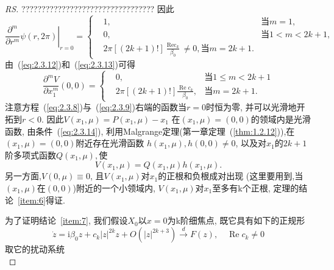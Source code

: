 \begin{proof}[RS]
?????????????????????????????????
因此
\begin{equation}
\label{eq:2.3.13}
\left.\frac{\partial^{m}}{\partial r^{m}} \psi(r, 2 \pi)\right|_{r=0}
=
\left\{
\begin{aligned}
  &1, &\text{当} m=1,\\
  &0, &\text{当} 1<m<2k+1,\\
  &2 \pi[(2 k+1) !] \frac{\operatorname{Rec}_{k}}{\beta_{0}} \neq 0,
  \text{当} m=2k+1.
\end{aligned}
  \right.
\end{equation}
由~(\ref{eq:2.3.12})和~(\ref{eq:2.3.13})可得
\begin{equation}
\label{eq:2.3.14}
\frac{\partial^{m} V}{\partial x_{1}^{m}}(0,0)
=
\left\{
\begin{aligned}
  &0,&\text{当} 1 \leqslant m<2 k+1\\
  &2 \pi[(2 k+1) !] \frac{\operatorname{Re} c_{k}}{\beta_{0}},
  &当m=2k+1.
\end{aligned}
  \right.
\end{equation}
注意方程~(\ref{eq:2.3.8})与~(\ref{eq:2.3.9})右端的函数当$r=0$时恒为零,
并可以光滑地开拓到$r<0$.
因此$V\left(x_{1}, \mu\right)=P\left(x_{1}, \mu\right)-x_{1}$
在$(x_1,\mu)=(0,0)$的领域内是光滑函数,
由条件~(\ref{eq:2.3.14}),
利用Malgrange定理(第一章定理~(\ref{thm:1.2.12})),在$(x_1,\mu)=(0,0)$附近存在光滑函数
$h\left(x_{1}, \mu\right), h(0,0) \neq 0$,
以及对$x_1$的$2k+1$阶多项式函数$Q(x_1,\mu),$使
$$
V\left(x_{1}, \mu\right)=Q\left(x_{1}, \mu\right) h\left(x_{1}, \mu\right).
$$
另一方面,$V(0, \mu) \equiv 0$,
且$V(x_1,\mu)$对$x_1$的正根和负根成对出现
(这里要用到,当$(x_1,\mu)$在$(0,0)$)附近的一个小领域内,
$V(x_1,\mu)$对$x_1$至多有k个正根,
定理的结论~\ref{item:6}得证.
\par
为了证明结论~\ref{item:7},
我们假设$X_0$以$x=0$为k阶细焦点,
既它具有如下的正规形
$$
\dot{z}=\mathrm{i} \beta_{0} z+c_{k}|z|^{2 k} z+O\left(|z|^{2k+3}\right) \stackrel{d}{\longrightarrow} F(z), \quad \operatorname{Re} c_{k} \neq 0
$$
取它的扰动系统
\begin{equation}

\end{equation}
\end{proof}
